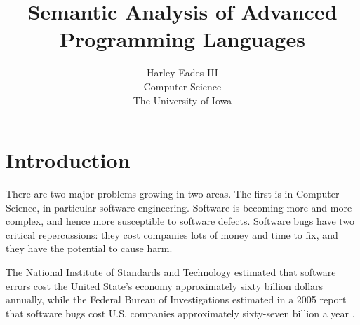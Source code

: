 \usepackage{amsmath,amssymb,amsthm,amstext}
\usepackage{mathpartir}
\usepackage{vmargin}
\usepackage{enumitem}
\usepackage{url}
\usepackage{todonotes}
\usepackage{listings}
\usepackage{stmaryrd} 
\usepackage{graphicx}
\usepackage{tikz}
\usepackage{hyperref}
\usetikzlibrary{arrows}
\usetikzlibrary{shapes}

\newtheorem{theorem}{Theorem}
\newtheorem{lemma}[theorem]{Lemma}
\newtheorem{corollary}[theorem]{Corollary}
\newtheorem{definition}[theorem]{Definition}
\newtheorem{proposition}[theorem]{Proposition}
\newtheorem{example}[theorem]{Example}

\newcommand{\redto}[0]{\rightsquigarrow}
\newcommand{\interp}[1]{\llbracket #1 \rrbracket}
\newcommand{\ifrName}[1]{#1}
\newcommand{\Sep}[0]{\text{Sep}^3}

\newcommand{\chcalc}[0]{\bar{\lambda}\mu\tilde{\mu}}

\newcommand{\cse}[0]{\noindent\underline{\textbf{Case:}}\ }


\newcommand{\ndto}[1]{\to_{#1}}
\newcommand{\ndwedge}[1]{\wedge_{#1}}

\newcommand{\To}[0]{\Rightarrow}



\title{Semantic Analysis of Advanced Programming Languages}

\author{Harley Eades III\\ Computer Science\\ The University of Iowa}

\date{}

\maketitle

\section{Introduction}
\label{sec:introduction}
There are two major problems growing in two areas.  The first is in
Computer Science, in particular software engineering. Software is
becoming more and more complex, and hence more susceptible to software
defects.  Software bugs have two critical repercussions: they cost
companies lots of money and time to fix, and they have the potential
to cause harm. 

The National Institute of Standards and Technology estimated that
software errors cost the United State's economy approximately sixty
billion dollars annually, while the Federal Bureau of Investigations
estimated in a 2005 report that software bugs cost U.S. companies
approximately sixty-seven billion a year \cite{nist02,fbi05}.

